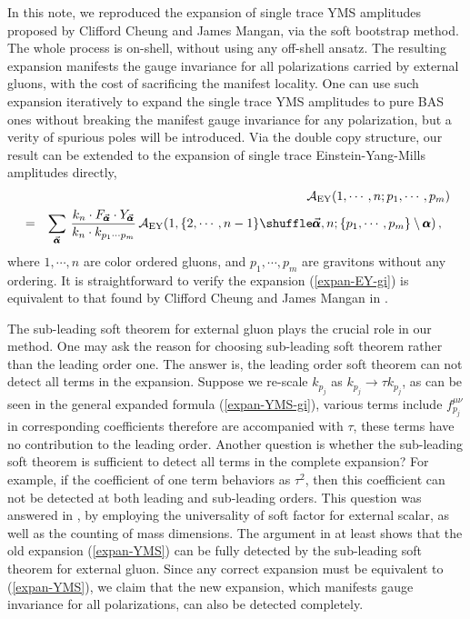 \documentclass[11pt,a4paper]{article}
\newcommand{\bea}{\begin{eqnarray}}
\newcommand{\eea}{\end{eqnarray}}
\newcommand{\nn}{\nonumber \\}
\def\eref#1{(\ref{#1})}
\def\a{{\alpha}}
\begin{document}
In this note, we reproduced the expansion of single trace YMS amplitudes proposed by Clifford Cheung and James Mangan, via the soft bootstrap method. The whole process is on-shell, without using any off-shell ansatz. The resulting expansion manifests the gauge invariance for all polarizations carried by external gluons, with the cost of sacrificing the manifest locality. One can use such expansion iteratively to expand the single trace YMS amplitudes to pure BAS ones without breaking the manifest gauge invariance for any polarization, but a verity of spurious poles will be introduced. Via the double copy structure, our result can be extended to the expansion of single trace Einstein-Yang-Mills amplitudes directly,
%
\bea
& &{\cal A}_{\rm EY}(1,\cdots,n;p_1,\cdots,p_m)\nn
&=&\sum_{\vec{\pmb{\a}}}\,{k_n\cdot F_{\vec{\pmb{\a}}}\cdot Y_{\vec{\pmb{\a}}}\over k_n\cdot k_{p_1\cdots p_m}}\,{\cal A}_{\rm EY}(1,\{2,\cdots,n-1\}\shuffle\vec{\pmb{\a}},n;\{p_1,\cdots,p_m\}\setminus{\pmb{\a}})\,,~~\label{expan-EY-gi}
\eea
%
where $1,\cdots,n$ are color ordered gluons, and $p_1,\cdots,p_m$ are gravitons without any ordering. It is straightforward to verify
the expansion \eref{expan-EY-gi} is equivalent to that found by Clifford Cheung and James Mangan in \cite{Cheung:2021zvb}.

The sub-leading soft theorem for external gluon plays the crucial role in our method. One may ask the reason for choosing sub-leading soft theorem rather than the leading order one. The answer is, the leading order soft theorem can not detect all terms in the expansion. Suppose we re-scale $k_{p_j}$ as $k_{p_j}\to\tau k_{p_j}$, as can be seen in the general expanded formula \eref{expan-YMS-gi}, various terms include $f_{p_j}^{\mu\nu}$ in corresponding coefficients therefore are accompanied with $\tau$, these terms have no contribution to the leading order.
Another question is whether the sub-leading soft theorem is sufficient to detect all terms in the complete expansion? For example, if the coefficient of one term behaviors as $\tau^2$, then this coefficient can not be detected at both leading and sub-leading orders. This question was answered in \cite{Zhou:2022orv}, by employing the universality of soft factor for external scalar, as well as the counting of mass dimensions. The argument in \cite{Zhou:2022orv} at least shows that the old expansion \eref{expan-YMS} can be fully detected by the sub-leading soft theorem for external gluon. Since any correct expansion must be equivalent to \eref{expan-YMS}, we claim that the new expansion, which manifests gauge invariance for all polarizations, can also be detected completely.
\end{document}
